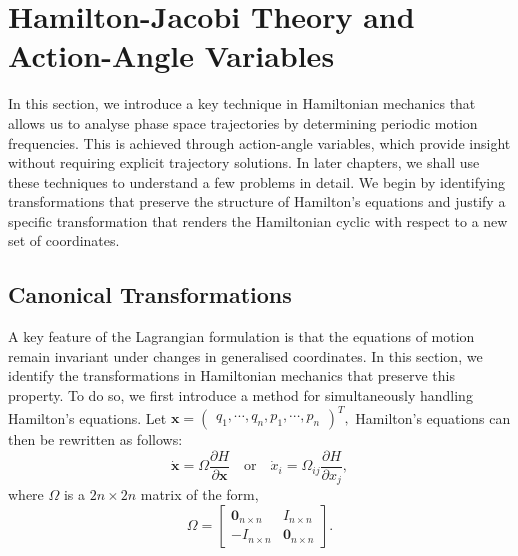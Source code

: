 \documentclass[12pt,oneside]{report}
\theoremstyle{definition}
\newtheorem{remark}{Remark}
\begin{document}
\section{Hamilton-Jacobi Theory and Action-Angle Variables}
In this section, we introduce a key technique in Hamiltonian mechanics that allows us to analyse phase space trajectories by determining periodic motion frequencies. This is achieved through action-angle variables, which provide insight without requiring explicit trajectory solutions. In later chapters, we shall use these techniques to understand a few problems in detail. We begin by identifying transformations that preserve the structure of Hamilton's equations and justify a specific transformation that renders the Hamiltonian cyclic with respect to a new set of coordinates.
\subsection{Canonical Transformations}
A key feature of the Lagrangian formulation is that the equations of motion remain invariant under changes in generalised coordinates. In this section, we identify the transformations in Hamiltonian mechanics that preserve this property. To do so, we first introduce a method for simultaneously handling Hamilton's equations. Let 
$
\mathbf{x} =
    \begin{pmatrix}
           q_{1}, 
            \cdots, 
           q_{n}, 
           p_{1}, 
           \cdots, 
           p_{n}
    \end{pmatrix}^{T},
$
Hamilton’s equations can then be rewritten as follows:
\begin{equation} \label{symHam}
 \dot{\mathbf{x}} = \Omega\frac{\partial H}{\partial \mathbf{x}}  \quad \text{or} \quad \dot{x}_{i} = \Omega_{ij} \frac{\partial H}{\partial x_{j}},
\end{equation} 
where $\Omega$ is a $2n \times 2n$ matrix of the form,
\begin{equation}
 \Omega = 
\begin{bmatrix}\label{symplectic}
\mathbf{0}_{n \times n} & I_{n \times n} \\
-I_{n \times n} & \mathbf{0}_{n \times n}
\end{bmatrix}.   
\end{equation}

\end{document}
